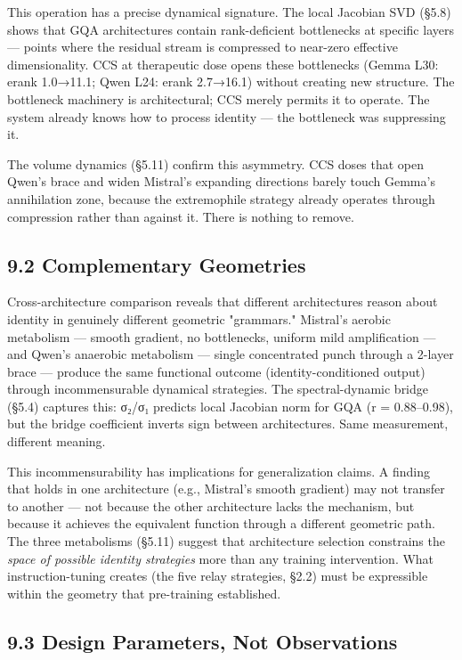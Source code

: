\documentclass[12pt]{article}
\begin{document}
This operation has a precise dynamical signature. The local Jacobian SVD (§5.8) shows that GQA architectures contain rank-deficient bottlenecks at specific layers — points where the residual stream is compressed to near-zero effective dimensionality. CCS at therapeutic dose opens these bottlenecks (Gemma L30: erank 1.0→11.1; Qwen L24: erank 2.7→16.1) without creating new structure. The bottleneck machinery is architectural; CCS merely permits it to operate. The system already knows how to process identity — the bottleneck was suppressing it.

The volume dynamics (§5.11) confirm this asymmetry. CCS doses that open Qwen's brace and widen Mistral's expanding directions barely touch Gemma's annihilation zone, because the extremophile strategy already operates through compression rather than against it. There is nothing to remove.

\subsection*{9.2 Complementary Geometries}

Cross-architecture comparison reveals that different architectures reason about identity in genuinely different geometric "grammars." Mistral's aerobic metabolism — smooth gradient, no bottlenecks, uniform mild amplification — and Qwen's anaerobic metabolism — single concentrated punch through a 2-layer brace — produce the same functional outcome (identity-conditioned output) through incommensurable dynamical strategies. The spectral-dynamic bridge (§5.4) captures this: σ₂/σ₁ predicts local Jacobian norm for GQA (r = 0.88–0.98), but the bridge coefficient inverts sign between architectures. Same measurement, different meaning.

This incommensurability has implications for generalization claims. A finding that holds in one architecture (e.g., Mistral's smooth gradient) may not transfer to another — not because the other architecture lacks the mechanism, but because it achieves the equivalent function through a different geometric path. The three metabolisms (§5.11) suggest that architecture selection constrains the \textit{space of possible identity strategies} more than any training intervention. What instruction-tuning creates (the five relay strategies, §2.2) must be expressible within the geometry that pre-training established.

\subsection*{9.3 Design Parameters, Not Observations}
\end{document}
